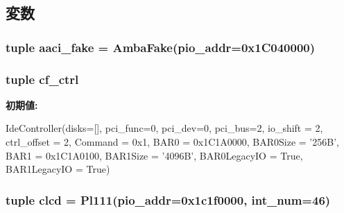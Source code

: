 \subsection{変数}
\hypertarget{classRealView_1_1VExpress__EMM_a40e0278b62fc0e814579ee52118d2e2a}{
\subsubsection[{aaci\_\-fake}]{\setlength{\rightskip}{0pt plus 5cm}tuple {\bf aaci\_\-fake} = {\bf AmbaFake}(pio\_\-addr=0x1C040000)}}
\label{classRealView_1_1VExpress__EMM_a40e0278b62fc0e814579ee52118d2e2a}
\hypertarget{classRealView_1_1VExpress__EMM_a3e7e22e24895378aafbb1c7b707248ae}{
\subsubsection[{cf\_\-ctrl}]{\setlength{\rightskip}{0pt plus 5cm}tuple {\bf cf\_\-ctrl}}}
\label{classRealView_1_1VExpress__EMM_a3e7e22e24895378aafbb1c7b707248ae}
{\bfseries 初期値:}
\begin{DoxyCode}
IdeController(disks=[], pci_func=0, pci_dev=0, pci_bus=2,
                            io_shift = 2, ctrl_offset = 2, Command = 0x1,
                            BAR0 = 0x1C1A0000, BAR0Size = '256B',
                            BAR1 = 0x1C1A0100, BAR1Size = '4096B',
                            BAR0LegacyIO = True, BAR1LegacyIO = True)
\end{DoxyCode}
\hypertarget{classRealView_1_1VExpress__EMM_aca2e883cdc9c636e4500344d5892f6c9}{
\subsubsection[{clcd}]{\setlength{\rightskip}{0pt plus 5cm}tuple {\bf clcd} = {\bf Pl111}(pio\_\-addr=0x1c1f0000, int\_\-num=46)}}
